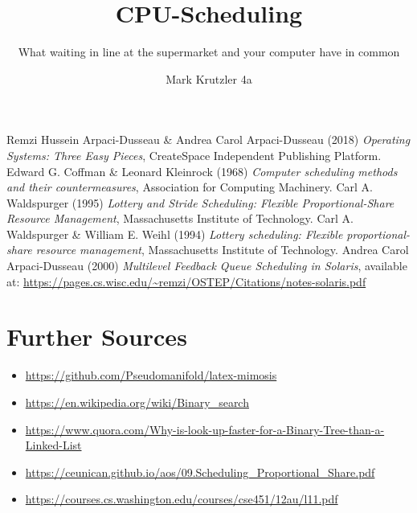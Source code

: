 \documentclass{mimosis}
\title{{CPU-Scheduling}}
\subtitle{What waiting in line at the supermarket and your computer have in common}
\author{Mark Krutzler 4a}
\begin{document}
          \frontmatter
          

          \tableofcontents

          \mainmatter


          

          

          \backmatter

          \begin{thebibliography}{99}
              Remzi Hussein Arpaci-Dusseau \& Andrea Carol Arpaci-Dusseau (2018) \emph{Operating Systems: Three Easy Pieces}, CreateSpace Independent Publishing Platform.
              Edward G. Coffman \& Leonard Kleinrock (1968) \emph{Computer scheduling methods and their countermeasures}, Association for Computing Machinery.
              Carl A. Waldspurger (1995) \emph{Lottery and Stride Scheduling: Flexible Proportional-Share Resource Management}, Massachusetts Institute of Technology.
              Carl A. Waldspurger \& William E. Weihl (1994) \emph{Lottery scheduling: Flexible proportional-share resource management}, Massachusetts Institute of Technology.
              Andrea Carol Arpaci-Dusseau (2000) \emph{Multilevel Feedback Queue Scheduling in Solaris}, available at: \url{https://pages.cs.wisc.edu/~remzi/OSTEP/Citations/notes-solaris.pdf}
          \end{thebibliography}

          \section*{Further Sources}
          \begin{itemize}
            \item \url{https://github.com/Pseudomanifold/latex-mimosis}
            \item \url{https://en.wikipedia.org/wiki/Binary_search}
            \item \url{https://www.quora.com/Why-is-look-up-faster-for-a-Binary-Tree-than-a-Linked-List}
            \item \url{https://ceunican.github.io/aos/09.Scheduling_Proportional_Share.pdf}
            \item \url{https://courses.cs.washington.edu/courses/cse451/12au/l11.pdf}
          \end{itemize}

          
\end{document}
